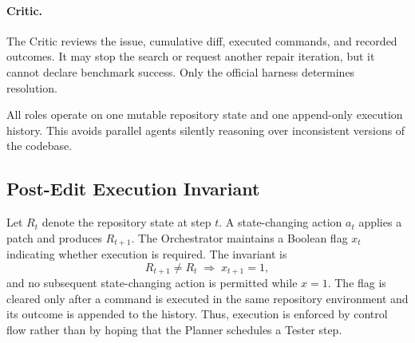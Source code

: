 \documentclass[journal]{IEEEtran}
\begin{document}
\paragraph{Critic.} The Critic reviews the issue, cumulative diff, executed commands, and recorded outcomes. It may stop the search or request another repair iteration, but it cannot declare benchmark success. Only the official harness determines resolution.

All roles operate on one mutable repository state and one append-only execution history. This avoids parallel agents silently reasoning over inconsistent versions of the codebase.

\subsection{Post-Edit Execution Invariant}
\label{sec:invariant}

Let $R_t$ denote the repository state at step $t$. A state-changing action $a_t$ applies a patch and produces $R_{t+1}$. The Orchestrator maintains a Boolean flag $x_t$ indicating whether execution is required. The invariant is
\begin{equation}
  R_{t+1} \neq R_t \;\Rightarrow\; x_{t+1}=1,
\end{equation}
and no subsequent state-changing action is permitted while $x=1$. The flag is cleared only after a command is executed in the same repository environment and its outcome is appended to the history. Thus, execution is enforced by control flow rather than by hoping that the Planner schedules a Tester step.
\end{document}
